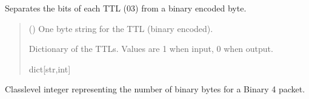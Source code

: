 \documentclass[letterpaper,10pt,english]{sphinxmanual}
\begin{document}
\begin{fulllineitems}
\begin{fulllineitems}
\begin{quote}
\begin{description}
\end{description}\end{quote}

\end{fulllineitems}


\begin{fulllineitems}
\label{\detokenize{PodDevice_8206HR:PodDevice_8206HR.POD_8206HR._TranslateTTLbyte_Binary}}
\pysigstartsignatures
{}
\pysigstopsignatures
\sphinxAtStartPar
Separates the bits of each TTL (0\sphinxhyphen{}3) from a binary encoded byte.
\begin{quote}\begin{description}
\sphinxAtStartPar
{} () \textendash{} One byte string for the TTL (binary encoded).

\sphinxAtStartPar
Dictionary of the TTLs. Values are 1 when input, 0 when output.

\sphinxAtStartPar
dict{[}str,int{]}

\end{description}\end{quote}

\end{fulllineitems}


\begin{fulllineitems}
\label{\detokenize{PodDevice_8206HR:PodDevice_8206HR.POD_8206HR.__B4BINARYLENGTH}}
\pysigstartsignatures
{}
\pysigstopsignatures
\sphinxAtStartPar
Class\sphinxhyphen{}level integer representing the number of binary bytes for a     Binary 4 packet.


\end{fulllineitems}
\end{fulllineitems}
\end{document}
